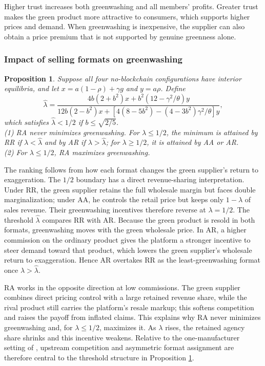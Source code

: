 \documentclass[preprint,review,12pt,authoryear,nopreprintline]{elsarticle}
\newtheorem{proposition}{Proposition}
\theoremstyle{definition}
\begin{document}
Higher trust increases both greenwashing and all members' profits. Greater trust makes the green product more attractive to consumers, which supports higher prices and demand. When greenwashing is inexpensive, the supplier can also obtain a price premium that is not supported by genuine greenness alone.

\subsubsection{Impact of selling formats on greenwashing}

\begin{proposition}\label{prop:ranking}
Suppose all four no-blockchain configurations have interior equilibria, and let $x=a(1-\rho)+\gamma g$ and $y=a\rho$. Define
\begin{equation*}
\hat{\lambda}=\frac{4b(2+b^2)x+b^2(12-\gamma^2/\theta)y}{12b(2-b^2)x+[4(8-5b^2)-(4-3b^2)\gamma^2/\theta]y},
\end{equation*}
which satisfies $\hat{\lambda}<1/2$ if $b\leq\sqrt{2/5}$.\\
(1) RA never minimizes greenwashing. For $\lambda\leq1/2$, the minimum is attained by RR if $\lambda<\hat{\lambda}$ and by AR if $\lambda>\hat{\lambda}$; for $\lambda\geq1/2$, it is attained by AA or AR.\\
(2) For $\lambda\leq1/2$, RA maximizes greenwashing.
\end{proposition}

The ranking follows from how each format changes the green supplier's return to exaggeration. The $1/2$ boundary has a direct revenue-sharing interpretation. Under RR, the green supplier retains the full wholesale margin but faces double marginalization; under AA, he controls the retail price but keeps only $1-\lambda$ of sales revenue. Their greenwashing incentives therefore reverse at $\lambda=1/2$. The threshold $\hat{\lambda}$ compares RR with AR. Because the green product is resold in both formats, greenwashing moves with the green wholesale price. In AR, a higher commission on the ordinary product gives the platform a stronger incentive to steer demand toward that product, which lowers the green supplier's wholesale return to exaggeration. Hence AR overtakes RR as the least-greenwashing format once $\lambda>\hat{\lambda}$.

RA works in the opposite direction at low commissions. The green supplier combines direct pricing control with a large retained revenue share, while the rival product still carries the platform's resale markup; this softens competition and raises the payoff from inflated claims. This explains why RA never minimizes greenwashing and, for $\lambda\leq1/2$, maximizes it. As $\lambda$ rises, the retained agency share shrinks and this incentive weakens. Relative to the one-manufacturer setting of \citet{xu2025should}, upstream competition and asymmetric format assignment are therefore central to the threshold structure in Proposition \ref{prop:ranking}.
\end{document}
